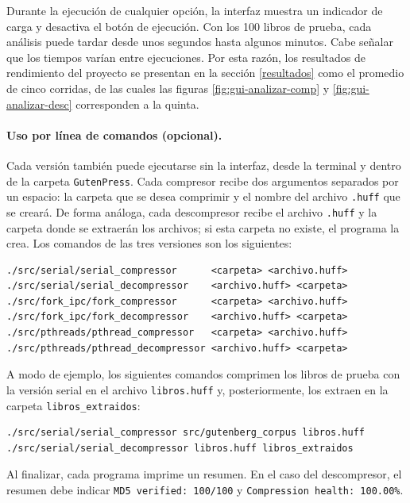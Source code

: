 \documentclass{report}
\begin{document}
Durante la ejecución de cualquier opción, la interfaz muestra un indicador de carga y desactiva el botón de ejecución. Con los 100 libros de prueba, cada análisis puede tardar desde unos segundos hasta algunos minutos. Cabe señalar que los tiempos varían entre ejecuciones. Por esta razón, los resultados de rendimiento del proyecto se presentan en la sección \ref{resultados} como el promedio de cinco corridas, de las cuales las figuras \ref{fig:gui-analizar-comp} y \ref{fig:gui-analizar-desc} corresponden a la quinta.

\clearpage

\paragraph{Uso por línea de comandos (opcional).} Cada versión también puede ejecutarse sin la interfaz, desde la terminal y dentro de la carpeta \texttt{GutenPress}. Cada compresor recibe dos argumentos separados por un espacio: la carpeta que se desea comprimir y el nombre del archivo \texttt{.huff} que se creará. De forma análoga, cada descompresor recibe el archivo \texttt{.huff} y la carpeta donde se extraerán los archivos; si esta carpeta no existe, el programa la crea. Los comandos de las tres versiones son los siguientes:

\begin{lstlisting}[style=terminal]
./src/serial/serial_compressor      <carpeta> <archivo.huff>
./src/serial/serial_decompressor    <archivo.huff> <carpeta>
./src/fork_ipc/fork_compressor      <carpeta> <archivo.huff>
./src/fork_ipc/fork_decompressor    <archivo.huff> <carpeta>
./src/pthreads/pthread_compressor   <carpeta> <archivo.huff>
./src/pthreads/pthread_decompressor <archivo.huff> <carpeta>
\end{lstlisting}

A modo de ejemplo, los siguientes comandos comprimen los libros de prueba con la versión serial en el archivo \texttt{libros.huff} y, posteriormente, los extraen en la carpeta \texttt{libros\_extraidos}:

\begin{lstlisting}[style=terminal]
./src/serial/serial_compressor src/gutenberg_corpus libros.huff
./src/serial/serial_decompressor libros.huff libros_extraidos
\end{lstlisting}

Al finalizar, cada programa imprime un resumen. En el caso del descompresor, el resumen debe indicar \texttt{MD5 verified: 100/100} y \texttt{Compression health: 100.00\%}.
\end{document}
